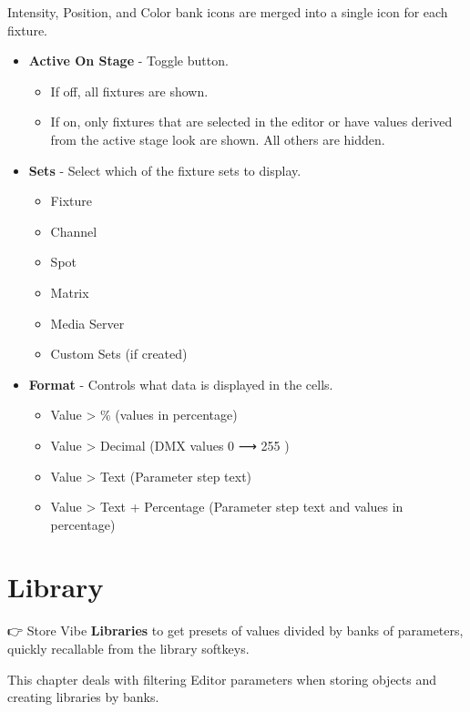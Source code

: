 \documentclass[
]{article}
\begin{document}
Intensity, Position, and Color bank icons are merged into a single icon for each fixture.

\begin{itemize}
\item
  \textbf{Active On Stage} - Toggle button.

  \begin{itemize}
  \item
    If off, all fixtures are shown.
  \item
    If on, only fixtures that are selected in the editor or have values derived from the active stage look are shown. All others are hidden.
  \end{itemize}
\item
  \textbf{Sets} - Select which of the fixture sets to display.

  \begin{itemize}
  \item
    Fixture
  \item
    Channel
  \item
    Spot
  \item
    Matrix
  \item
    Media Server
  \item
    Custom Sets (if created)
  \end{itemize}
\item
  \textbf{Format} - Controls what data is displayed in the cells.

  \begin{itemize}
  \item
    Value \textgreater{} \% (values in percentage)
  \item
    Value \textgreater{} Decimal (DMX values 0 ⟶ 255 )
  \item
    Value \textgreater{} Text (Parameter step text)
  \item
    Value \textgreater{} Text + Percentage (Parameter step text and values in percentage)
  \end{itemize}
\end{itemize}

\hypertarget{library}{%
\section{Library}\label{library}}

👉 Store Vibe \textbf{Libraries} to get presets of values divided by banks of parameters, quickly recallable from the library softkeys.

This chapter deals with filtering Editor parameters when storing objects and creating libraries by banks.
\end{document}
